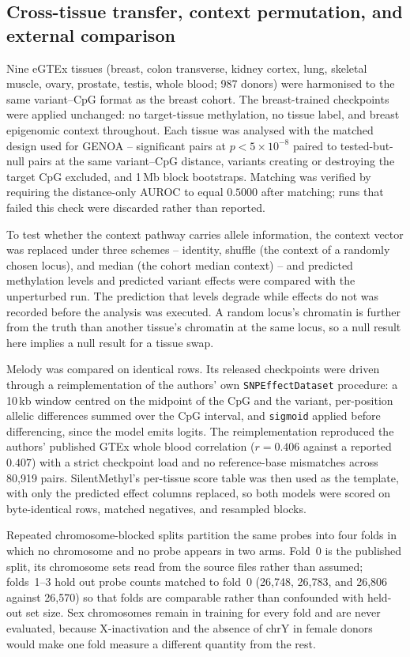 \documentclass[10pt,letterpaper,twocolumn]{article}
\begin{document}
{\subsection{Cross-tissue transfer, context permutation, and external comparison}
\label{sec:transfer-methods}

Nine eGTEx tissues (breast, colon transverse, kidney cortex, lung, skeletal
muscle, ovary, prostate, testis, whole blood; 987 donors) were harmonised to the
same variant--CpG format as the breast cohort. The breast-trained checkpoints
were applied unchanged: no target-tissue methylation, no tissue label, and
breast epigenomic context throughout. Each tissue was analysed with the matched
design used for GENOA -- significant pairs at $p<5\times10^{-8}$ paired to
tested-but-null pairs at the same variant--CpG distance, variants creating or
destroying the target CpG excluded, and 1\,Mb block bootstraps. Matching was
verified by requiring the distance-only AUROC to equal $0.5000$ after matching;
runs that failed this check were discarded rather than reported.

To test whether the context pathway carries allele information, the context
vector was replaced under three schemes -- identity, shuffle (the context of a
randomly chosen locus), and median (the cohort median context) -- and predicted
methylation levels and predicted variant effects were compared with the
unperturbed run. The prediction that levels degrade while effects do not was
recorded before the analysis was executed. A random locus's chromatin is further
from the truth than another tissue's chromatin at the same locus, so a null
result here implies a null result for a tissue swap.

Melody \cite{jin2026melody} was compared on identical rows. Its released
checkpoints were driven through a reimplementation of the authors' own
\texttt{SNPEffectDataset} procedure: a 10\,kb window centred on the midpoint of
the CpG and the variant, per-position allelic differences summed over the CpG
interval, and \texttt{sigmoid} applied before differencing, since the model
emits logits. The reimplementation reproduced the authors' published GTEx whole
blood correlation ($r=0.406$ against a reported $0.407$) with a strict
checkpoint load and no reference-base mismatches across 80,919 pairs.
SilentMethyl's per-tissue score table was then used as the template, with only
the predicted effect columns replaced, so both models were scored on
byte-identical rows, matched negatives, and resampled blocks.

Repeated chromosome-blocked splits partition the same probes into four folds in
which no chromosome and no probe appears in two arms. Fold~0 is the published
split, its chromosome sets read from the source files rather than assumed;
folds~1--3 hold out probe counts matched to fold~0 (26,748, 26,783, and 26,806
against 26,570) so that folds are comparable rather than confounded with
held-out set size. Sex chromosomes remain in training for every fold and are
never evaluated, because X-inactivation and the absence of chrY in female donors
would make one fold measure a different quantity from the rest.
}
\end{document}
